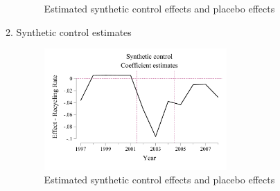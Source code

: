 \documentclass{article}
\begin{document}
\begin{enumerate}
\begin{enumerate}
\begin{figure}[H]
        \caption{Estimated synthetic control effects and placebo effects}
        \label{f:placebo}
    \end{figure}
    \item Synthetic control estimates
    \begin{figure}[H]
        \centering
        \includegraphics[width=0.7\textwidth]{./figure/effect.pdf}
        \caption{Estimated synthetic control effects and placebo effects}
        \label{f:effect}
    \end{figure}
\end{enumerate}


\end{enumerate}
\end{document}
